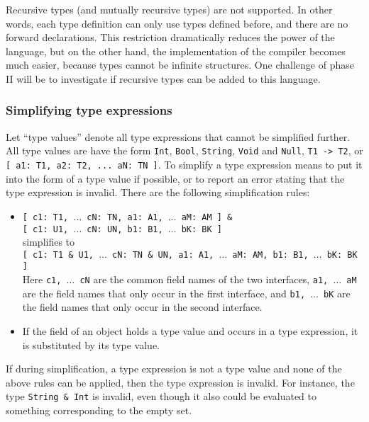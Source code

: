\documentclass[12pt, draft]{article}
\begin{document}
Recursive types (and mutually recursive types) are not supported. In other words, each type definition can only use types defined before, and there are no forward declarations. This restriction dramatically reduces the power of the language, but on the other hand, the implementation of the compiler becomes much easier, because types cannot be infinite structures. One challenge of phase II will be to investigate if recursive types can be added to this language.


\subsubsection{Simplifying type expressions}

Let ``type values'' denote all type expressions that cannot be simplified further. All type values are have the form  \texttt{Int}, \texttt{Bool}, \texttt{String}, \texttt{Void} and \texttt{Null}, \texttt{T1 -> T2}, or \texttt{[ a1: T1, a2: T2, ... aN: TN ]}. To simplify a type expression means to put it into the form of a type value if possible, or to report an error stating that the type expression is invalid. There are the following simplification rules:

\begin{itemize}
\item  \texttt{[ c1: T1, $\dots$ cN: TN, a1: A1, $\dots$ aM: AM ] \&} \\
      \texttt{[ c1: U1, $\dots$ cN: UN, b1: B1, $\dots$ bK: BK ]} \\
      simplifies to \\
      \texttt{[ c1: T1 \& U1, $\dots$ cN: TN \& UN, a1: A1, $\dots$ aM: AM, b1: B1, $\dots$ bK: BK ]} \\
      Here \texttt{c1, $\dots$ cN} are the common field names of the two interfaces, \texttt{a1, $\dots$ aM} are the field names that only occur in the first interface, and \texttt{b1, $\dots$ bK} are the field names that only occur in the second interface.
\item If the field of an object holds a type value and occurs in a type expression, it is substituted by its type value.
\end{itemize}

If during simplification, a type expression is not a type value and none of the above rules can be applied, then the type expression is invalid. For instance, the type \texttt{String \& Int} is invalid, even though it also could be evaluated to something corresponding to the empty set. 
\end{document}
